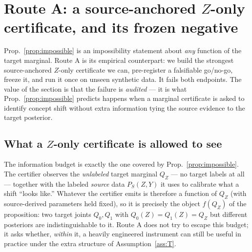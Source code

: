 \section{Route A: a source-anchored $Z$-only certificate, and its frozen negative}
\label{sec:routeA}

Prop.~\ref{prop:impossible} is an impossibility statement about \emph{any} function of the target marginal.
Route A is its empirical counterpart: we build the strongest source-anchored $Z$-only certificate we can,
pre-register a falsifiable go/no-go, freeze it, and run it once on unseen synthetic data. It fails both endpoints. The
value of the section is that the failure is \emph{audited} --- it is what Prop.~\ref{prop:impossible} predicts
happens when a marginal certificate is asked to identify concept shift without extra information tying the
source evidence to the target posterior.

\subsection{What a $Z$-only certificate is allowed to see}
The information budget is exactly the one covered by Prop.~\ref{prop:impossible}. The certifier observes the
\emph{unlabeled} target marginal $Q_Z$ --- no target labels at all --- together with the labeled
\emph{source} data $P_S(Z,Y)$ it uses to calibrate what a shift ``looks like.'' Whatever the certifier emits
is therefore a function of $Q_Z$ (with source-derived parameters held fixed), so it is precisely the object
$f(Q_Z)$ of the proposition: two target joints $Q_0,Q_1$ with $Q_0(Z)=Q_1(Z)=Q_Z$ but different posteriors
are indistinguishable to it. Route A does not try to escape this budget; it asks whether, \emph{within} it, a
heavily engineered instrument can still be useful in practice under the extra structure of
Assumption~\ref{ass:T}.

